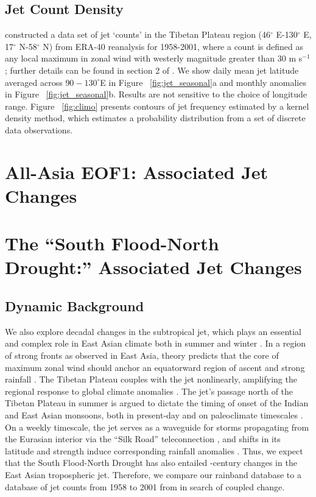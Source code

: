 \subsection{Jet Count Density} 

	\citet{Schiemann2009} constructed a data set of jet `counts' in the Tibetan Plateau region (46$^{\circ}$ E-130$^{\circ}$ E, 17$^{\circ}$ N-58$^{\circ}$ N) from ERA-40 reanalysis for 1958-2001, where a count is defined as any local maximum in zonal wind with westerly magnitude greater than $30$ m s$^{-1}$; further details can be found in section 2 of \citet{Schiemann2009}. We show daily mean jet latitude averaged across $90-130^\circ$E in Figure ~\ref{fig:jet_seasonal}a and monthly anomalies in Figure ~\ref{fig:jet_seasonal}b. Results are not sensitive to the choice of longitude range. Figure ~\ref{fig:climo} presents contours of jet frequency estimated by a kernel density method, which estimates a probability distribution from a set of discrete data observations.
	
\section{All-Asia EOF1: Associated Jet Changes}

\section{The ``South Flood-North Drought:'' Associated Jet Changes}

\subsection{Dynamic Background}

	We also explore decadal changes in the subtropical jet, which plays an essential and complex role in East Asian climate both in summer and winter \citep{Molnar2010,Yang2002}. In a region of strong fronts as observed in East Asia, theory predicts that the core of maximum zonal wind should anchor an equatorward region of ascent and strong rainfall \citep{Holton2004}. The Tibetan Plateau couples with the jet nonlinearly, amplifying the regional response to global climate anomalies \citep{Nigam1989,Broccoli1992,Park1997}. The jet's passage north of the Tibetan Plateau in summer is argued to dictate the timing of onset of the Indian and East Asian monsoons, both in present-day \citep{Yin1949,Yeh1959,Hahn1975} and on paleoclimate timescales \citep{Nagashima2011,Nagashima2013,Chiang2015}. On a weekly timescale, the jet serves as a waveguide for storms propagating from the Eurasian interior via the ``Silk Road'' teleconnection \citep{Hoskins1993,Ambrizzi1997,Kosaka2012}, and shifts in its latitude and strength induce corresponding rainfall anomalies \citep{Liang1998,Kwon2007,Du2009,Li2014}. Thus, we expect that the South Flood-North Drought has also entailed -century changes in the East Asian tropospheric jet. Therefore, we compare our rainband database to a database of jet counts from 1958 to 2001 from \citet{Schiemann2009} in search of coupled change.

